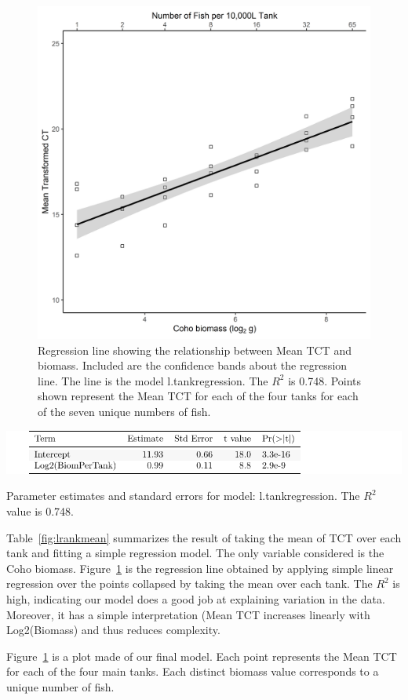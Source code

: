  
\begin{figure}[H]
\includegraphics{Chapter3Images/ggplotnew4.png}
\caption{ \hspace{1mm} Regression line showing the relationship between Mean TCT and biomass. Included are the confidence bands about the regression line.  The line is the model l.tankregression. The $ R^{2}$ is 0.748. Points shown represent the Mean TCT for each of the four tanks for each of the seven unique numbers of fish.
}
\label{fig:medct55}
\end{figure}



\begin{table}[H]
\includegraphics{Chapter3Images/tankregressionMEAN.pdf}
\caption{\hspace{1mm}Parameter estimates and standard errors for model: l.tankregression. The $R^{2}$ value is 0.748.}
\label{fig:lrankmean}
\end{table}

Table~\ref{fig:lrankmean} summarizes the result of taking the mean of TCT over each tank and fitting a simple regression model. The only variable considered is the Coho biomass. Figure~\ref{fig:medct55} is the regression line obtained by applying simple linear regression over the points collapsed by taking the mean over each tank. The $R^{2}$ is high, indicating our model does a good job at explaining variation in the data. Moreover, it has a simple interpretation (Mean TCT increases linearly with Log2(Biomass) and thus reduces complexity.




Figure~\ref{fig:medct55} is a plot made of our final model. Each point represents the Mean TCT for each of the four main tanks. Each distinct biomass value corresponds to a unique number of fish. 


